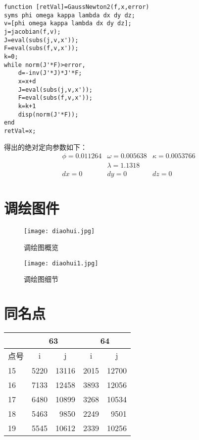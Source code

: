 \begin{lstlisting}[caption=GaussNewton2.m文件]
function [retVal]=GaussNewton2(f,x,error)
syms phi omega kappa lambda dx dy dz;
v=[phi omega kappa lambda dx dy dz];
j=jacobian(f,v);
J=eval(subs(j,v,x'));
F=eval(subs(f,v,x'));
k=0;
while norm(J'*F)>error,
    d=-inv(J'*J)*J'*F;
    x=x+d
    J=eval(subs(j,v,x'));
    F=eval(subs(f,v,x'));
    k=k+1
    disp(norm(J'*F));
end
retVal=x;
\end{lstlisting}

得出的绝对定向参数如下：
\begin{equation}
\begin{array}{lll}
\phi=0.011264 & \omega=0.005638 & \kappa=0.0053766 \\
& \lambda=1.1318 & \\
dx=0 & dy=0 & dz=0  
\end{array}
\end{equation}

\section{调绘图件}

\begin{figure}[htbp]
\centering
\caption{调绘图概览}
\texttt{[image: diaohui.jpg]}
\end{figure}

\begin{figure}[htbp]
\centering
\caption{调绘图细节}
\texttt{[image: diaohui1.jpg]}
\end{figure}

\section{同名点}

\begin{table}[htbp]
    \centering
    \begin{tabular}{lrrrr}
        \toprule
        & \multicolumn{2}{c}{63} & \multicolumn{2}{c}{64} \\ \hline
        点号 & \multicolumn{1}{c}{i} & \multicolumn{1}{c}{j} & \multicolumn{1}{c}{i} & \multicolumn{1}{c}{j} \\ \midrule
        15 & 5220 & 13116 & 2015 & 12700 \\
        16 & 7133 & 12458 & 3893 & 12056 \\
        17 & 6480 & 10899 & 3268 & 10534 \\
        18 & 5463 & 9850 & 2249 & 9501 \\
        19 & 5545 & 10612 & 2339 & 10256 \\ \bottomrule
    \end{tabular}
    \end{table}
